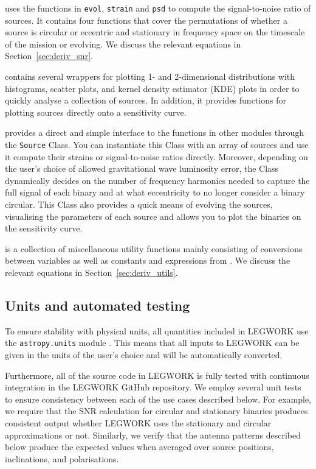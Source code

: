 \documentclass[twocolumn, linenumbers]{aastex631}
\newcommand{\referee}[1]{{\color{WildStrawberry} #1}}
\newcommand{\lw}{LEGWORK}
\newcommand{\lwColour}{SeaGreen}
\newcommand{\lwModLink}[1]{\href{https://legwork.readthedocs.io/en/latest/modules.html\#module-legwork.#1}{\color{\lwColour}{\texttt{#1}}}}
\begin{document}
\lwModLink{snr} uses the functions in \texttt{evol}, \texttt{strain} and \texttt{psd} to compute the signal-to-noise ratio of sources. It contains four functions that cover the permutations of whether a source is circular or eccentric and stationary in frequency space on the timescale of the mission or evolving. We discuss the relevant equations in Section~\ref{sec:deriv_snr}.

\lwModLink{visualisation} contains several wrappers for plotting 1- and 2-dimensional distributions with histograms, scatter plots, and kernel density estimator (KDE) plots in order to quickly analyse a collection of sources. In addition, it provides functions for plotting sources directly onto a sensitivity curve.

\lwModLink{source} provides a direct and simple interface to the functions in other modules through the \texttt{Source} Class. You can instantiate this Class with an array of sources and use it compute their strains or signal-to-noise ratios directly. Moreover, depending on the user's choice of allowed gravitational wave luminosity error, the Class dynamically decides on the number of frequency harmonics needed to capture the full signal of each binary and at what eccentricity to no longer consider a binary circular. This Class also provides a quick means of evolving the sources, visualising the parameters of each source and allows you to plot the binaries on the sensitivity curve.

\lwModLink{utils} is a collection of miscellaneous utility functions mainly consisting of conversions between variables as well as constants and expressions from \citet{Peters+1964}. We discuss the relevant equations in Section~\ref{sec:deriv_utils}.

\subsection{\referee{Units and automated testing}}

To ensure stability with physical units, all quantities included in \lw{} use the \texttt{astropy.units} module \citep{AstropyCollaboration+2013, AstropyCollaboration+2018}. This means that all inputs to \lw{} can be given in the units of the user's choice and will be automatically converted.

Furthermore, all of the source code in \lw{} is fully tested with continuous integration in the \lw{} GitHub repository. We employ several unit tests to ensure consistency between each of the use cases described below. For example, we require that the SNR calculation for circular and stationary binaries produces consistent output whether \lw{} uses the stationary and circular approximations or not. Similarly, we verify that the antenna patterns described below produce the expected values when averaged over source positions, inclinations, and polarisations.
\end{document}
